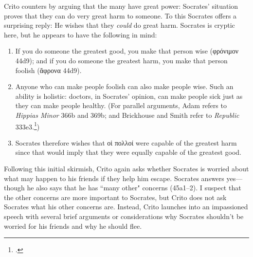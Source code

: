 \documentclass[12pt,letterpaper]{article}
\begin{document}
Crito counters by arguing that the many have great power: Socrates' situation proves that they can do very great harm to someone. To this Socrates offers a surprising reply: He wishes that they \emph{could} do great harm. Socrates is cryptic here, but he appears to have the following in mind:

\begin{enumerate}

    \item If you do someone the greatest good, you make that person wise (\textgreek{φρόνιμον} 44d9); and if you do someone the greatest harm, you make that person foolish (\textgreek{ἄφρονα} 44d9).

    \item Anyone who can make people foolish can also make people wise. Such an ability is holistic: doctors, in Socrates' opinion, can make people sick just as they can make people healthy. (For parallel arguments, Adam refers to \textit{Hippias Minor} 366b and 369b; and Brickhouse and Smith refer to \textit{Republic} 333e3.\footcites[][on 44d]{adam1988-crito}[][200]{brickhouse-smith2004-plato-trial-of-socrates})

    \item Socrates therefore wishes that \textgreek{οἱ πολλοί} were capable of the greatest harm since that would imply that they were equally capable of the greatest good.

\end{enumerate}

Following this initial skirmish, Crito again asks whether Socrates is worried about what may happen to his friends if they help him escape. Socrates answers yes---though he also says that he has ``many other" concerns (45a1--2). I suspect that the other concerns are more important to Socrates, but Crito does not ask Socrates what his other concerns are. Instead, Crito launches into an impassioned speech with several brief arguments or considerations why Socrates shouldn't be worried for his friends and why he should flee.
\end{document}

